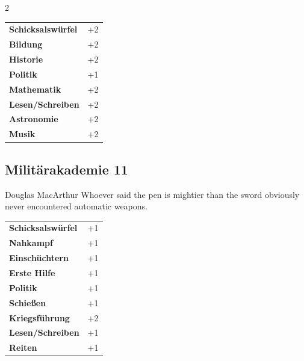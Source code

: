 \begin{multicols}{2}
\begin{tcolorbox}
\begin{tabular}{@{}ll@{}}
    \textbf{Schicksalswürfel} & +2\\
    \textbf{Bildung} & +2\\
    \textbf{Historie} & +2\\
    \textbf{Politik} & +1\\
    \textbf{Mathematik} & +2\\
    \textbf{Lesen/Schreiben} & +2\\
    \textbf{Astronomie} & +2\\
    \textbf{Musik} & +2\\
\end{tabular}


\end{tcolorbox}

\begin{tcolorbox}
    \subsection*{Militärakademie \hfill \small{11 }}
    \tcblower


\begin{pquote}{Douglas MacArthur}
Whoever said the pen is mightier than the sword obviously never encountered automatic weapons.
\end{pquote}

\vspace{3mm}

\begin{tabular}{@{}ll@{}}
    \textbf{Schicksalswürfel} & +1\\
    \textbf{Nahkampf} & +1\\
    \textbf{Einschüchtern} & +1\\
    \textbf{Erste Hilfe} & +1\\
    \textbf{Politik} & +1\\
    \textbf{Schießen} & +1\\
    \textbf{Kriegsführung} & +2\\
    \textbf{Lesen/Schreiben} & +1\\
    \textbf{Reiten} & +1\\
\end{tabular}



\end{tcolorbox}
\end{multicols}
